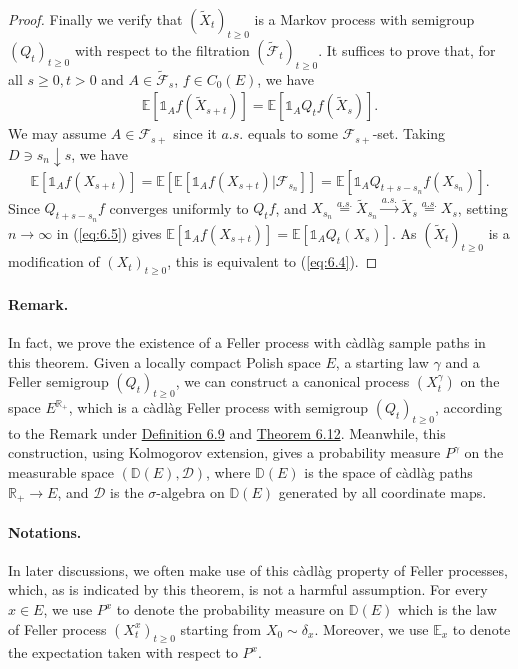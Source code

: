 \documentclass{article}
\numberwithin{equation}{section}
\newcommand{\E}{\mathbb{E}}
\theoremstyle{plain}
\theoremstyle{definition}
\begin{document}
\begin{proof}
Finally we verify that $(\widetilde{X}_t)_{t\geq 0}$ is a Markov process with semigroup $(Q_t)_{t\geq 0}$ with respect to the filtration $(\widetilde{\mathscr{F}}_t)_{t\geq 0}$. It suffices to prove that, for all $s\geq 0,t>0$ and $A\in\widetilde{\mathscr{F}}_s$, $f\in C_0(E)$, we have
\begin{align*}
	\E\left[\mathds{1}_Af(\widetilde{X}_{s+t})\right]=\E\left[\mathds{1}_AQ_tf(\widetilde{X}_s)\right].\tag{6.4}\label{eq:6.4}
\end{align*}
We may assume $A\in\mathscr{F}_{s+}$ since it $a.s.$ equals to some $\mathscr{F}_{s+}$-set. Taking $D\ni s_n\downarrow s$, we have
\begin{align*}
	\E\left[\mathds{1}_Af(X_{s+t})\right]=\E\left[\E\left[\mathds{1}_Af(X_{s+t})|\mathscr{F}_{s_n}\right]\right]=\E\left[\mathds{1}_AQ_{t+s-s_n}f(X_{s_n})\right].\label{eq:6.5}\tag{6.5}
\end{align*}
Since $Q_{t+s-s_n}f$ converges uniformly to $Q_tf$, and $X_{s_n}\overset{a.s.}{=}\widetilde{X}_{s_n}\overset{a.s.}{\to}\widetilde{X}_s\overset{a.s.}{=}X_s$, setting $n\to\infty$ in (\ref{eq:6.5}) gives $\E[\mathds{1}_Af(X_{s+t})]=\E[\mathds{1}_AQ_t(X_s)]$. As $(\widetilde{X}_t)_{t\geq 0}$ is a modification of $(X_t)_{t\geq 0}$, this is equivalent to (\ref{eq:6.4}).
\end{proof}

\paragraph{Remark.} In fact, we prove the existence of a Feller process with càdlàg sample paths in this theorem. Given a locally compact Polish space $E$, a starting law $\gamma$ and a Feller semigroup $(Q_t)_{t\geq 0}$, we can construct a canonical process $(X_t^\gamma)$ on the space $E^{\mathbb{R}_+}$, which is a càdlàg Feller process with semigroup $(Q_t)_{t\geq 0}$, according to the Remark under \hyperref[def:6.9]{Definition 6.9} and \hyperref[thm:6.12]{Theorem 6.12}. Meanwhile, this construction, using Kolmogorov extension, gives a probability measure $P^\gamma$ on the measurable space $(\mathbb{D}(E),\mathscr{D})$, where $\mathbb{D}(E)$ is the space of càdlàg paths $\mathbb{R}_+\to E$, and $\mathscr{D}$ is the $\sigma$-algebra on $\mathbb{D}(E)$ generated by all coordinate maps.

\paragraph{Notations.} In later discussions, we often make use of this càdlàg property of Feller processes, which, as is indicated by this theorem, is not a harmful assumption. For every $x\in E$, we use $P^x$ to denote the probability measure on $\mathbb{D}(E)$ which is the law of Feller process $(X_t^x)_{t\geq 0}$ starting from $X_0\sim\delta_x$. Moreover, we use $\E_x$ to denote the expectation taken with respect to $P^x$.
\end{document}
